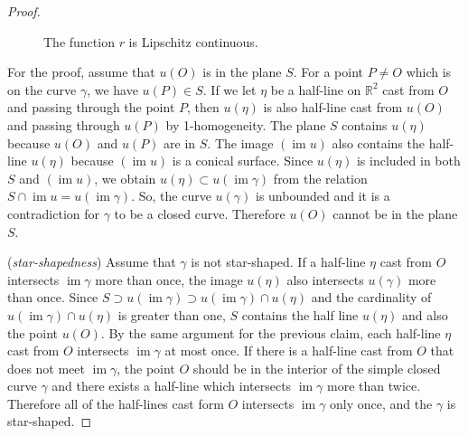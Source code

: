 \documentclass{amsart}
\theoremstyle{plain}
\theoremstyle{definition}
\theoremstyle{remark}
\DeclareMathOperator{\im}{im}
\begin{document}
\begin{proof}
\begin{figure}%
\caption{The function $r$ is Lipschitz continuous.}
\end{figure}


For the proof, 
assume that $u(O)$ is in the plane $S$.
For a point $P\ne O$ which is on the curve $\gamma$, we have $u(P)\in S$.
If we let $\eta$ be a half-line on $\mathbb{R}^2$ cast from $O$ and passing through the point $P$, then $u(\eta)$ is also half-line cast from $u(O)$ and passing through $u(P)$ by 1-homogeneity. %
The plane $S$ contains $u(\eta)$ because $u(O)$ and $u(P)$ are in $S$. %
The image $(\im u)$ also contains the half-line $u(\eta)$ because $(\im u)$ is a conical surface.
Since $u(\eta)$ is included in both $S$ and $(\im u)$, we obtain $u(\eta)\subset u(\im\gamma)$ from the relation $S\cap\im u=u(\im \gamma)$.
So, the curve $u(\gamma)$ is unbounded and it is a contradiction for $\gamma$ to be a closed curve.
Therefore $u(O)$ cannot be in the plane $S$.

(\emph{star-shapedness})
Assume that $\gamma$ is not star-shaped.
If a half-line $\eta$ cast from $O$ intersects $\im\gamma$ more than once, the image $u(\eta)$ also intersects $u(\gamma)$ more than once.
Since $S\supset u(\im\gamma)\supset u(\im\gamma)\cap u(\eta)$ and the cardinality of $u(\im\gamma)\cap u(\eta)$ is greater than one, $S$ contains the half line $u(\eta)$ and also the point $u(O)$. %
By the same argument for the previous claim, each half-line $\eta$ cast from $O$ intersects $\im\gamma$ at most once.
If there is a half-line cast from $O$ that does not meet $\im\gamma$, the point $O$ should be in the interior of the simple closed curve $\gamma$ and there exists a half-line which intersects $\im\gamma$ more than twice.
Therefore all of the half-lines cast form $O$ intersects $\im\gamma$ only once, and the $\gamma$ is star-shaped.


\end{proof}
\end{document}
